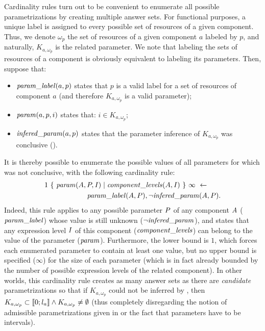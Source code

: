 Cardinality rules turn out to be convenient to enumerate all possible parametrizations by creating multiple answer sets.
For functional purposes, a unique label is assigned to every possible set of resources of a given component.
Thus, we denote $\omega_p$ the set of resources of a given component $a$ labeled by $p$,
and naturally, $K_{a,\omega_p}$ is the related parameter.
We note that labeling the sets of resources of a component is obviously equivalent to labeling its parameters.
Then, suppose that:
\begin{itemize}
  \item $\mathit{param\_label}(a, p)$ states that $p$ is a valid label for a set of resources of component $a$ (and therefore $K_{a,\omega_p}$ is a valid parameter);
  \item $\mathit{param}(a, p, i)$ states that: $i \in K_{a, \omega_p}$;
  \item $\mathit{infered\_param}(a, p)$ states that the parameter inference of $K_{a, \omega_p}$ was conclusive ().
\end{itemize}
It is thereby possible to enumerate the possible values of all parameters for which  was not conclusive, with the following cardinality rule:
\begin{align*}
  & 1\ \{\ \mathit{param}(A, P, I) \mid \mathit{component\_levels}(A, I)\ \}\ \infty\ \leftarrow \\
  & \qquad\qquad\qquad \mathit{param\_label}(A, P), \neg \mathit{infered\_param}(A, P).
\end{align*}
Indeed, this rule applies to any possible parameter $P$ of any component $A$ ($\mathit{param\_label}$) whose value is still unknown ($\neg \mathit{infered\_param}$),
and states that any expression level $I$ of this component ($\mathit{component\_levels}$) can belong to the value of the parameter ($\mathit{param}$).
Furthermore, the lower bound is $1$, which forces each enumerated parameter to contain at least one value,
but no upper bound is specified ($\infty$) for the size of each parameter
(which is in fact already bounded by the number of possible expression levels of the related component).
In other worlds, this cardinality rule creates as many answer sets as there are \emph{candidate} parametrizations
so that if $K_{a, \omega_p}$ could not be inferred by , then
$K_{a, \omega_p} \subset \llbracket 0 ; l_a \rrbracket \wedge K_{a, \omega_p} \neq \emptyset$
(thus completely disregarding the notion of admissible parametrizations given in  or the fact that parameters have to be intervals).



